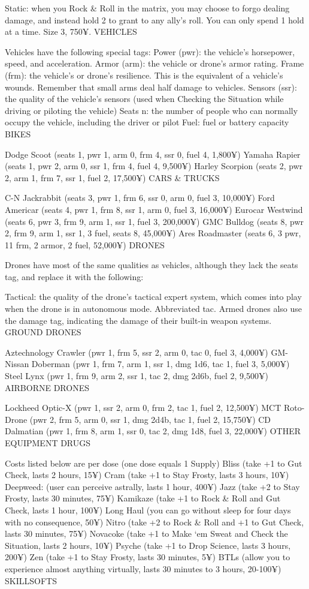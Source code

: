 Static: when you Rock \& Roll in the matrix, you may choose to forgo dealing damage, and instead hold 2 to grant to any ally’s roll. You can only spend 1 hold at a time. Size 3, 750¥.
VEHICLES

Vehicles have the following special tags:
Power (pwr): the vehicle’s horsepower, speed, and acceleration.
Armor (arm): the vehicle or drone’s armor rating.
Frame (frm): the vehicle’s or drone’s resilience. This is the equivalent of a vehicle’s wounds. Remember that small arms deal half damage to vehicles.
Sensors (ssr): the quality of the vehicle’s sensors (used when Checking the Situation while driving or piloting the vehicle)
Seats n: the number of people who can normally occupy the vehicle, including the driver or pilot
Fuel: fuel or battery capacity
BIKES

Dodge Scoot (seats 1, pwr 1, arm 0, frm 4, ssr 0, fuel 4, 1,800¥)
Yamaha Rapier (seats 1, pwr 2, arm 0, ssr 1, frm 4, fuel 4, 9,500¥)
Harley Scorpion (seats 2, pwr 2, arm 1, frm 7, ssr 1, fuel 2, 17,500¥)
CARS \& TRUCKS

C-N Jackrabbit (seats 3, pwr 1, frm 6, ssr 0, arm 0, fuel 3, 10,000¥)
Ford Americar (seats 4, pwr 1, frm 8, ssr 1, arm 0, fuel 3, 16,000¥)
Eurocar Westwind (seats 6, pwr 3, frm 9, arm 1, ssr 1, fuel 3, 200,000¥)
GMC Bulldog (seats 8, pwr 2, frm 9, arm 1, ssr 1, 3 fuel, seats 8, 45,000¥)
Ares Roadmaster (seats 6, 3 pwr, 11 frm, 2 armor, 2 fuel, 52,000¥)
DRONES

Drones have most of the same qualities as vehicles, although they lack the seats tag, and replace it with the following:

Tactical: the quality of the drone’s tactical expert system, which comes into play when the drone is in autonomous mode. Abbreviated tac.
Armed drones also use the damage tag, indicating the damage of their built-in weapon systems.
GROUND DRONES

Aztechnology Crawler (pwr 1, frm 5, ssr 2, arm 0, tac 0, fuel 3, 4,000¥)
GM-Nissan Doberman (pwr 1, frm 7, arm 1, ssr 1, dmg 1d6, tac 1, fuel 3, 5,000¥)
Steel Lynx (pwr 1, frm 9, arm 2, ssr 1, tac 2, dmg 2d6b, fuel 2, 9,500¥)
AIRBORNE DRONES

Lockheed Optic-X (pwr 1, ssr 2, arm 0, frm 2, tac 1, fuel 2, 12,500¥)
MCT Roto-Drone (pwr 2, frm 5, arm 0, ssr 1, dmg 2d4b, tac 1, fuel 2, 15,750¥)
CD Dalmatian (pwr 1, frm 8, arm 1, ssr 0, tac 2, dmg 1d8, fuel 3, 22,000¥)
OTHER EQUIPMENT
DRUGS

Costs listed below are per dose (one dose equals 1 Supply)
Bliss (take +1 to Gut Check, lasts 2 hours, 15¥)
Cram (take +1 to Stay Frosty, lasts 3 hours, 10¥)
Deepweed: (user can perceive astrally, lasts 1 hour, 400¥)
Jazz (take +2 to Stay Frosty, lasts 30 minutes, 75¥) Kamikaze (take +1 to Rock \& Roll and Gut Check, lasts 1 hour, 100¥)
Long Haul (you can go without sleep for four days with no consequence, 50¥)
Nitro (take +2 to Rock \& Roll and +1 to Gut Check, lasts 30 minutes, 75¥)
Novacoke (take +1 to Make ‘em Sweat and Check the Situation, lasts 2 hours, 10¥)
Psyche (take +1 to Drop Science, lasts 3 hours, 200¥)
Zen (take +1 to Stay Frosty, lasts 30 minutes, 5¥)
BTLs (allow you to experience almost anything virtually, lasts 30 minutes to 3 hours, 20-100¥)
SKILLSOFTS

